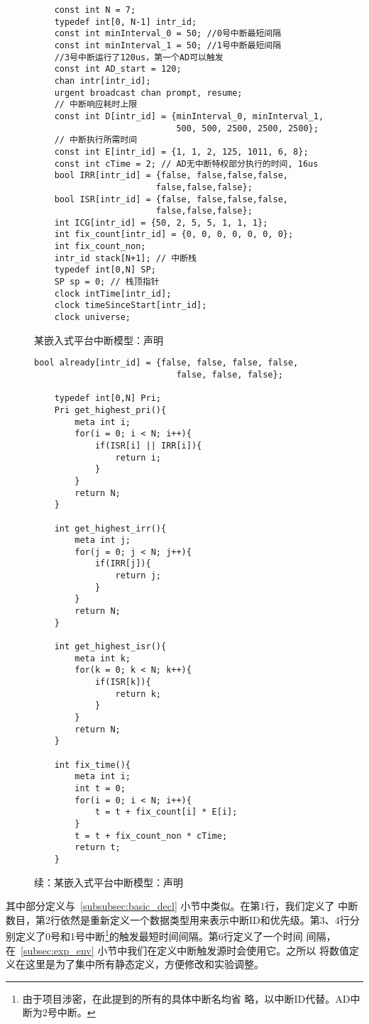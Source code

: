 \begin{figure}[H]
	\centering
	\begin{lstlisting}
	const int N = 7;
	typedef int[0, N-1] intr_id; 	
	const int minInterval_0 = 50; //0号中断最短间隔
	const int minInterval_1 = 50; //1号中断最短间隔	
	//3号中断运行了120us，第一个AD可以触发
	const int AD_start = 120; 	
	chan intr[intr_id];
	urgent broadcast chan prompt, resume;	
	// 中断响应耗时上限
	const int D[intr_id] = {minInterval_0, minInterval_1, 
							500, 500, 2500, 2500, 2500};
	// 中断执行所需时间 
	const int E[intr_id] = {1, 1, 2, 125, 1011, 6, 8}; 
	const int cTime = 2; // AD无中断特权部分执行的时间, 16us
	bool IRR[intr_id] = {false, false,false,false,
						false,false,false};
	bool ISR[intr_id] = {false, false,false,false,
						false,false,false};
	int ICG[intr_id] = {50, 2, 5, 5, 1, 1, 1}; 
	int fix_count[intr_id] = {0, 0, 0, 0, 0, 0, 0};
	int fix_count_non;	
	intr_id stack[N+1]; // 中断栈
	typedef int[0,N] SP;
	SP sp = 0; // 栈顶指针
	clock intTime[intr_id];
	clock timeSinceStart[intr_id];
	clock universe;	
	\end{lstlisting}
	\caption{某嵌入式平台中断模型：声明}
	\label{fig:exp_decl}
\end{figure}

\begin{figure}[H]
	\centering
	\begin{lstlisting}[firstnumber=28]
	bool already[intr_id] = {false, false, false, false, 
							false, false, false};	

	typedef int[0,N] Pri;
	Pri get_highest_pri(){
		meta int i;
		for(i = 0; i < N; i++){
			if(ISR[i] || IRR[i]){
				return i;
			} 
		}
		return N;
	}
	
	int get_highest_irr(){
		meta int j;
		for(j = 0; j < N; j++){
			if(IRR[j]){
				return j;
			} 
		}
		return N;
	}
	
	int get_highest_isr(){
		meta int k;
		for(k = 0; k < N; k++){
			if(ISR[k]){
				return k;
			} 
		}
		return N;
	}
	
	int fix_time(){
		meta int i;
		int t = 0;
		for(i = 0; i < N; i++){
			t = t + fix_count[i] * E[i];
		}
		t = t + fix_count_non * cTime;
		return t;
	} 
	\end{lstlisting}
	\caption{续：某嵌入式平台中断模型：声明}
	\label{fig:exp_decl_2}
\end{figure}

其中部分定义与~\ref{subsubsec:basic_decl} 小节中类似。在第1行，我们定义了
中断数目，第2行依然是重新定义一个数据类型用来表示中断ID和优先级。第3、4行分
别定义了0号和1号中断\footnote{由于项目涉密，在此提到的所有的具体中断名均省
略，以中断ID代替。AD中断为2号中断。}的触发最短时间间隔。第6行定义了一个时间
间隔，在~\ref{subsec:exp_env} 小节中我们在定义中断触发源时会使用它。之所以
将数值定义在这里是为了集中所有静态定义，方便修改和实验调整。

